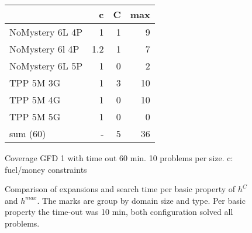 \setlength{\tabcolsep}{3pt}
\begin{figure}[ht]
	\centering
	\begin{tabular}{l|r|rr}
			& c & C & max \\\hline
		NoMystery 6L 4P & 1 & 1 & 9 \\
		NoMystery 6l 4P & 1.2 & 1 & 7\\
		NoMystery 6L 5P & 1 & 0 & 2\\
		TPP 5M 3G & 1 & 3 & 10\\
		TPP 5M 4G & 1 & 0 & 10\\
		TPP 5M 5G & 1 & 0 &	0 \\\hline
		sum \numtasks(60) & - & 5 & 36 \\
	\end{tabular}
	\caption{Coverage GFD 1 with time out 60 min. 10 problems per size. c: fuel/money constraints }
\end{figure}

\begin{figure}[ht]
		

		
	\caption{Comparison of expansions and search time per basic property of $h^C$ and $h^{max}$. 
		The marks are group by domain size and type. 
		Per basic property the time-out was 10 min, both configuration solved all problems.}
\end{figure}


